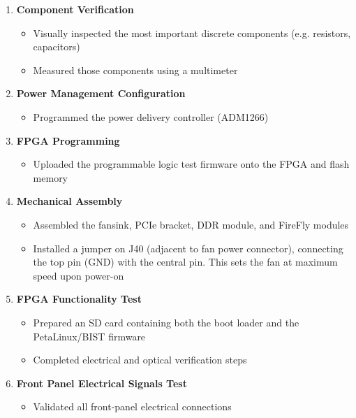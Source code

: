\begin{enumerate}
    \item \textbf{Component Verification}
    \begin{itemize}
        \item Visually inspected the most important discrete components (e.g. resistors, capacitors)
        \item Measured those components using a multimeter
    \end{itemize}

    \item \textbf{Power Management Configuration}
    \begin{itemize}
        \item Programmed the power delivery controller (ADM1266)
    \end{itemize}

    \item \textbf{FPGA Programming}
    \begin{itemize}
        \item Uploaded the programmable logic test firmware onto the FPGA and flash memory
    \end{itemize}

    \item \textbf{Mechanical Assembly}
    \begin{itemize}
        \item Assembled the fansink, \acs{PCIe} bracket, DDR module, and FireFly modules
        \item Installed a jumper on J40 (adjacent to fan power connector), connecting the top pin (GND) with the central pin. This sets the fan at maximum speed upon power-on
    \end{itemize}

    \item \textbf{FPGA Functionality Test}
    \begin{itemize}
        \item Prepared an SD card containing both the boot loader and the PetaLinux/BIST firmware
        \item Completed electrical and optical verification steps
    \end{itemize}

    \item \textbf{Front Panel Electrical Signals Test}
    \begin{itemize}
        \item Validated all front-panel electrical connections
    \end{itemize}
\end{enumerate}

